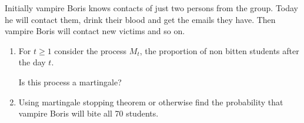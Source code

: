 \begin{enumerate}
    Initially vampire Boris knows contacts of just two persons from the group. Today he will contact them, drink their blood and get the emails they have. Then vampire Boris will contact new victims and so on.
    
    \begin{enumerate}
        \item For $t\geq 1$ consider the process $M_t$, the proportion of non bitten students after the day $t$. 
        
        Is this process a martingale?
        
        \item Using martingale stopping theorem or otherwise find the probability that vampire Boris will bite all 70 students. 
    \end{enumerate}
 
 
\end{enumerate}


